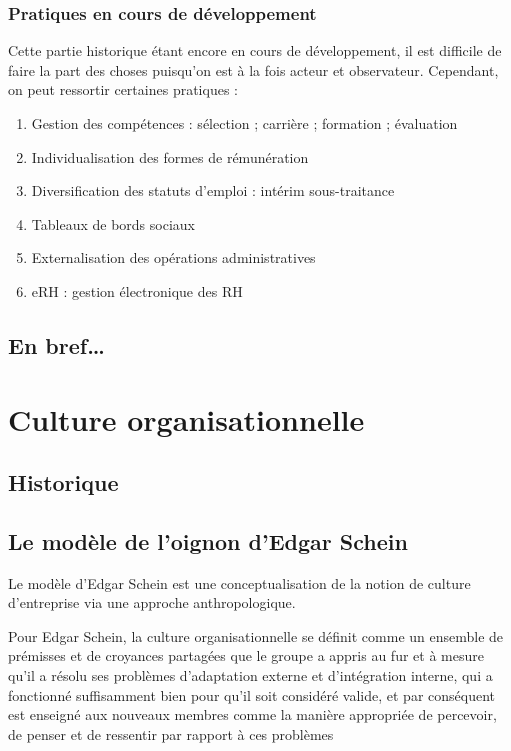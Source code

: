 \documentclass[12pt]{article}
\begin{document}
		\subsubsection{Pratiques en cours de développement}
		
		Cette partie historique étant encore en cours de développement, il est difficile de faire la part des choses puisqu'on est à la fois acteur et observateur. Cependant, on peut ressortir certaines pratiques :
		
		\begin{enumerate}
		 \item Gestion des compétences :
		    \subitem sélection ;
		    \subitem carrière ;
		    \subitem formation ;
		    \subitem évaluation
		 \item Individualisation des formes de rémunération
		 \item Diversification des statuts d'emploi :
		    \subitem intérim
		    \subitem sous-traitance
		 \item Tableaux de bords sociaux
		 \item Externalisation des opérations administratives
		 \item eRH : gestion électronique des RH
		\end{enumerate}

		
	\subsection{En bref…}
	

\section{Culture organisationnelle}
	\subsection{Historique}
	\subsection{Le modèle de l'oignon d'Edgar Schein}
	
	Le modèle d'Edgar Schein est une conceptualisation de la notion de culture d'entreprise via une approche anthropologique.
	
	Pour Edgar Schein, la culture organisationnelle se définit comme \og{} un ensemble de prémisses et de croyances partagées que le groupe a appris au fur et à mesure qu'il a résolu ses problèmes d'adaptation externe et d'intégration interne, qui a fonctionné suffisamment bien pour qu'il soit considéré valide, et par conséquent est enseigné aux nouveaux membres comme la manière appropriée de percevoir, de penser et de ressentir par rapport à ces problèmes \fg{} \cite{schein2010}
	
\end{document}
